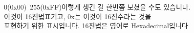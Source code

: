 \documentclass[preview]{standalone}
\begin{document}
\begin{center}
0(0x00)~255(0xFF)이렇게 생긴 걸 한번쯤 보셨을 수도 있습니다.\\이것이 16진법표기고, 0x는 이것이 16진수라는 것을\\표현하기 위한 표시입니다. 16진법은 영어로 Hexadecimal입니다
\end{center}
\end{document}

